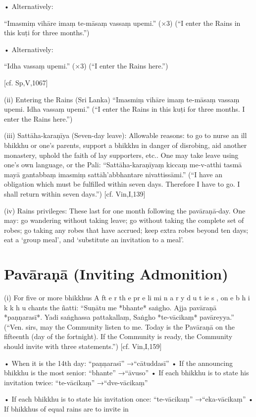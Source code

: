 • Alternatively:

“Imasmiṃ vihāre
imaṃ te-māsaṃ vassaṃ upemi.” (×3)
(“I enter the Rains in this kuṭi for three months.”)

• Alternatively:

“Idha vassaṃ upemi.” (×3)
(“I enter the Rains here.”)

[cf. Sp,V,1067]

(ii) Entering the Rains (Sri Lanka)
“Imasmiṃ vihāre
imaṃ te-māsaṃ vassaṃ upemi.
Idha vassaṃ upemi.”
(“I enter the Rains in this kuṭi for three months.
I enter the Rains here.”)

(iii) Sattāha-karaṇīya (Seven-day leave):
Allowable reasons: to go to nurse an ill
bhikkhu or one’s parents, support a bhikkhu
in danger of disrobing, aid another monastery, uphold the faith of lay supporters, etc..
One may take leave using one’s own language,
or the Pali:
“Sattāha-karaṇīyaṃ kiccaṃ me-v-atthi
tasmā mayā gantabbaṃ imasmiṃ
sattāh’abbhantare nivattissāmi.”
(“I have an obligation which must be fulfilled within
seven days. Therefore I have to go. I shall return
within seven days.”)
[cf. Vin,I,139]

(iv) Rains privileges:
These last for one month following the
pavāraṇā-day. One may: go wandering without taking leave; go without taking the complete set of robes; go taking any robes that
have accrued; keep extra robes beyond ten
days; eat a ‘group meal’, and ‘substitute an
invitation to a meal’.

\section{Pavāraṇā (Inviting Admonition)}

(i) For five or more bhikkhus
A ft e r th e pr e li mi n a r y d u t ie s , on e b h i k k h u
chants the ñatti:
“Suṇātu me *bhante* saṅgho.
Ajja pavāraṇā *paṇṇarasī*.
Yadi saṅghassa pattakallaṃ,
Saṅgho *te-vācikaṃ* pavāreyya.”
(“Ven. sirs, may the Community listen to me. Today
is the Pavāraṇā on the fifteenth (day of the
fortnight). If the Community is ready, the
Community should invite with three statements.”)
[cf. Vin,I,159]

• When it is the 14th day:
“paṇṇarasī” →“cātuddasī”
• If the announcing bhikkhu is the most senior:
“bhante” →“āvuso”
• If each bhikkhu is to state his invitation twice:
“te-vācikaṃ” →“dve-vācikaṃ”

• If each bhikkhu is to state his invitation once:
“te-vācikaṃ” →“eka-vācikaṃ”
• If bhikkhus of equal rains are to invite in

